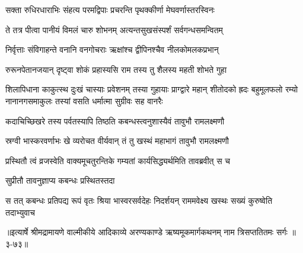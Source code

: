 \twolineshloka
{सक्ता रुधिरधाराभिः संहत्य परमद्विपाः}
{प्रचरन्ति पृथक्कीर्णा मेघवर्णास्तरस्विनः} %

\twolineshloka
{ते तत्र पीत्वा पानीयं विमलं चारु शोभनम्}
{अत्यन्तसुखसंस्पर्शं सर्वगन्धसमन्वितम्} %

\twolineshloka
{निर्वृत्ताः संविगाहन्ते वनानि वनगोचराः}
{ऋक्षांश्च द्वीपिनश्चैव नीलकोमलकप्रभान्} %

\twolineshloka
{रुरूनपेतानजयान् दृष्ट्वा शोकं प्रहास्यसि}
{राम तस्य तु शैलस्य महती शोभते गुहा} %

\threelineshloka
{शिलापिधाना काकुत्स्थ दुःखं चास्याः प्रवेशनम्}
{तस्या गुहायाः प्राग्द्वारे महान् शीतोदको ह्रदः बहुमूलफलो रम्यो नानानगसमाकुलः}
{तस्यां वसति धर्मात्मा सुग्रीवः सह वानरैः} %

\twolineshloka
{कदाचिच्छिखरे तस्य पर्वतस्यापि तिष्ठति}
{कबन्धस्त्वनुशास्यैवं तावुभौ रामलक्ष्मणौ} %

\twolineshloka
{स्रग्वी भास्करवर्णाभः खे व्यरोचत वीर्यवान्}
{तं तु खस्थं महाभागं तावुभौ रामलक्ष्मणौ} %

\twolineshloka
{प्रस्थितौ त्वं व्रजस्वेति वाक्यमूचतुरन्तिके}
{गम्यतां कार्यसिद्ध्यर्थमिति तावब्रवीत् स च} %

\onelineshloka
{सुप्रीतौ तावनुज्ञाप्य कबन्धः प्रस्थितस्तदा} %

\twolineshloka
{स तत् कबन्धः प्रतिपद्य रूपं वृतः श्रिया भास्वरसर्वदेहः}
{निदर्शयन् राममवेक्ष्य खस्थः सख्यं कुरुष्वेति तदाभ्युवाच} %


॥इत्यार्षे श्रीमद्रामायणे वाल्मीकीये आदिकाव्ये अरण्यकाण्डे ऋष्यमूकमार्गकथनम् नाम त्रिसप्ततितमः सर्गः ॥३-७३॥
